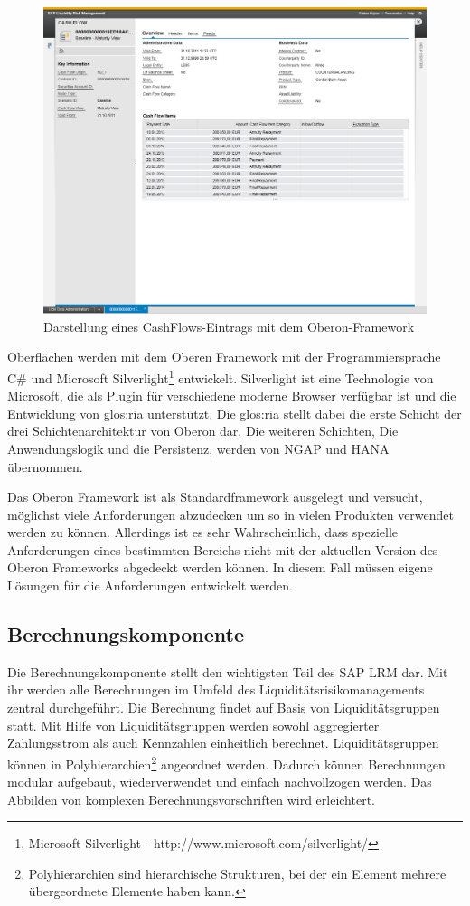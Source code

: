 \begin{figure}[h]
\centering
\setlength{\unitlength}{1mm}
\includegraphics[width=15cm]{images/OberonUI.png}
\caption{Darstellung eines CashFlows-Eintrags mit dem Oberon-Framework\label{fig:oberon}}
\end{figure}
Oberflächen werden mit dem Oberen Framework mit der Programmiersprache C\# und Microsoft Silverlight\footnote{Microsoft Silverlight - http://www.microsoft.com/silverlight/} entwickelt. Silverlight ist eine Technologie von Microsoft, die als Plugin für verschiedene moderne Browser verfügbar ist und die Entwicklung von \gls{glos:ria} unterstützt. Die \gls{glos:ria} stellt dabei die erste Schicht der drei Schichtenarchitektur von Oberon dar. Die weiteren Schichten, Die Anwendungslogik und die Persistenz, werden von NGAP und HANA übernommen.

Das Oberon Framework ist als Standardframework ausgelegt und versucht, möglichst viele Anforderungen abzudecken um so in vielen Produkten verwendet werden zu können. Allerdings ist es sehr Wahrscheinlich, dass spezielle Anforderungen eines bestimmten Bereichs nicht mit der aktuellen Version des Oberon Frameworks abgedeckt werden können. In diesem Fall müssen eigene Lösungen für die Anforderungen entwickelt werden.

\subsection{Berechnungskomponente}
Die Berechnungskomponente stellt den wichtigsten Teil des SAP LRM dar. Mit ihr werden alle Berechnungen im Umfeld des Liquiditätsrisikomanagements zentral durchgeführt. Die Berechnung findet auf Basis von Liquiditätsgruppen statt. Mit Hilfe von Liquiditätsgruppen werden sowohl aggregierter Zahlungsstrom als auch Kennzahlen einheitlich berechnet. Liquiditätsgruppen können in Polyhierarchien\footnote{Polyhierarchien sind hierarchische Strukturen, bei der ein Element mehrere übergeordnete Elemente haben kann.} angeordnet werden. Dadurch können Berechnungen modular aufgebaut, wiederverwendet und einfach nachvollzogen werden. Das Abbilden von komplexen Berechnungsvorschriften wird erleichtert.

